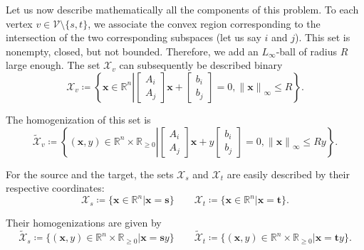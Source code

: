 \documentclass[a4paper, 12pt]{article}
\newlength{\indentsize}
\begin{document}
\hspace{\indentsize} Let us now describe mathematically all the components of this problem. To each vertex $v \in \mathcal{V}\setminus\{s,t\}$, we associate the convex region corresponding to the intersection of the two corresponding subspaces (let us say $i$ and $j$). This set is nonempty, closed, but not bounded. Therefore, we add an $L_{\infty}$-ball of radius $R$ large enough. The set $\mathcal{X}_v$ can subsequently be described binary \[\mathcal{X}_v \coloneq \left\{\mathbf{x} \in \mathbb{R}^n \left\lvert \begin{bmatrix} A_i \\ A_j \end{bmatrix} \mathbf{x} + \begin{bmatrix} b_i \\ b_j \end{bmatrix} = 0, {\lVert \mathbf{x} \rVert}_\infty \leq R \right.\right\}.\]

The homogenization of this set is~\cite[eq. 2.5]{Tobia} \[\tilde{\mathcal{X}}_v \coloneq \left\{(\mathbf{x},y) \in \mathbb{R}^n \times \mathbb{R}_{\geq 0} \left\lvert \begin{bmatrix} A_i \\ A_j \end{bmatrix} \mathbf{x} + y \begin{bmatrix} b_i \\ b_j \end{bmatrix} = 0, {\lVert \mathbf{x} \rVert}_\infty \leq Ry \right.\right\}.\]

For the source and the target, the sets $\mathcal{X}_s$ and $\mathcal{X}_t$ are easily described by their respective coordinates: \[\mathcal{X}_s \coloneq \{\mathbf{x} \in \mathbb{R}^n \left\lvert \mathbf{x} = \mathbf{s}\right.\} \qquad \mathcal{X}_t \coloneq \{\mathbf{x} \in \mathbb{R}^n \left\lvert \mathbf{x} = \mathbf{t}\right.\}.\]

Their homogenizations are given by
\begin{equation}\label{eq:homogenizationSourceTarget}
    \tilde{\mathcal{X}}_s \coloneq \{(\mathbf{x},y) \in \mathbb{R}^n \times \mathbb{R}_{\geq 0} \left\lvert \mathbf{x} = \mathbf{s} y \right.\} \qquad \tilde{\mathcal{X}}_t \coloneq \{(\mathbf{x},y) \in \mathbb{R}^n \times \mathbb{R}_{\geq 0} \left\lvert \mathbf{x} = \mathbf{t} y \right.\}.
\end{equation}
\end{document}
